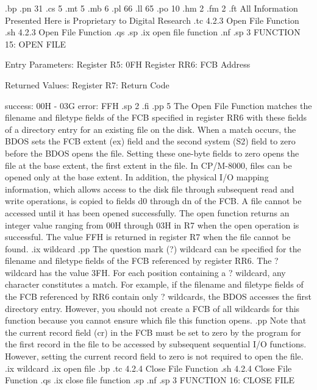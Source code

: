 .bp
.pn 31
.cs 5
.mt 5
.mb 6
.pl 66
.ll 65
.po 10
.hm 2
.fm 2
.ft All Information Presented Here is Proprietary to Digital Research
.tc         4.2.3  Open File Function 
.sh
4.2.3  Open File Function
.qs
.sp
.ix open file function
.nf
.sp 3
                    FUNCTION 15:  OPEN FILE

             Entry Parameters:
                Register   R5:  0FH
                Register  RR6:  FCB Address

             Returned  Values:
                Register   R7:  Return Code

                                success:  00H - 03G
                                  error:  FFH
.sp 2 
.fi
.pp 5
The Open File Function matches the filename and filetype fields of the FCB
specified in register  RR6 with these fields of a directory entry for an
existing file on the disk.  When a match occurs, the BDOS sets the FCB
extent (ex) field and the second system (S2) field to zero before the BDOS
opens the file. Setting these one-byte fields to zero opens the file at the
base extent, the first extent in the file. In CP/M-8000, files can be opened
only at the base extent. In addition, the physical I/O mapping information,
which allows access to the disk file through subsequent read and write
operations, is copied to fields d0 through dn of the FCB. A file cannot be
accessed until it has been opened successfully. The open function returns
an integer value ranging from 00H through 03H in   R7 when the open
operation is successful. The value FFH is returned in register   R7 when
the file cannot be found. 
.ix wildcard
.pp
The question mark (?) wildcard can be specified
for the filename and filetype fields of the FCB referenced by
register  RR6.  The ? wildcard has the value 3FH. For each position
containing a ? wildcard, any character constitutes a match. For
example, if the filename and filetype fields of the FCB
referenced by  RR6 contain only ? wildcards, the BDOS accesses the
first directory entry. However, you should not create a FCB of all wildcards 
for this function because you cannot ensure which file this function 
opens. 
.pp
Note that the current record field (cr) in the FCB must be set to
zero by the program for the first record in the file to be
accessed by subsequent sequential I/O functions. However, setting the
current record field to zero is not required to open the file.
.ix wildcard
.ix open file
.bp
.tc         4.2.4 Close File Function
.sh
4.2.4  Close File Function
.qs
.ix close file function
.sp
.nf
.sp 3
                    FUNCTION 16:  CLOSE FILE

